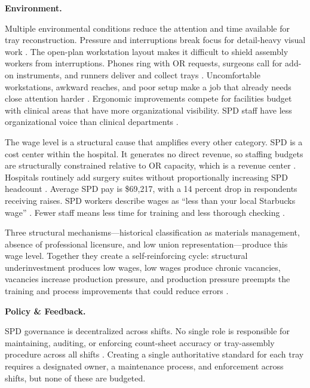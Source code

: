 \documentclass[10pt,a4paper]{article}
\begin{document}
\textbf{Environment.}

Multiple environmental conditions reduce the attention and time available for
tray reconstruction. Pressure and interruptions break focus for detail-heavy
visual work
\cite{alfred-et-al-2021, huang-et-al-2025}. The open-plan
workstation layout makes it difficult to shield assembly workers from
interruptions. Phones ring with OR requests, surgeons call for add-on
instruments, and runners deliver and collect trays
\cite{huang-et-al-2025}. Uncomfortable workstations, awkward reaches, and poor
setup make a job that already needs close attention harder
\cite{osha-central-sterile-supply-accessed-2026, cdc-niosh-2024, osha-computer-workstations-accessed-2026}. Ergonomic improvements compete
for facilities budget with clinical areas that have more organizational
visibility. SPD staff have less organizational voice than clinical departments
\cite{surgical-directions-spd-invisible-2025}.

The wage level is a structural cause that amplifies every other category. SPD is
a cost center within the hospital. It generates no direct revenue, so staffing
budgets are structurally constrained relative to OR capacity, which is a revenue
center
\cite{steris-capital-budgeting-2024, moab-healthcare-spd-cost-center-2024}. Hospitals routinely add surgery
suites without proportionally increasing SPD headcount
\cite{ingold-2025}. Average
SPD pay is \$69,217, with a 14 percent drop in respondents receiving raises. SPD
workers describe wages as ``less than your local Starbucks wage''
\cite{nadeau-2023-spd-salary-survey, perry-circulating-life-spd-2022}. Fewer
staff means less time for training and less thorough checking
\cite{alfred-et-al-2021, aorn-staffing-shortage-2025, macola-et-al-2025, brozak-2025, onet-medical-equipment-preparers-accessed-2026}.

Three structural mechanisms---historical classification as materials management,
absence of professional licensure, and low union representation---produce this
wage level. Together they create a self-reinforcing cycle: structural
underinvestment produces low wages, low wages produce chronic vacancies,
vacancies increase production pressure, and production pressure preempts the
training and process improvements that could reduce errors
\cite{evolved-sterile-processing-2025, specialtycare-travel-spd-2026, bls-union-2023, trends-in-labor-unionization-2022, ashhra-2024}.

\textbf{Policy \& Feedback.}

SPD governance is decentralized across shifts. No single role is responsible for
maintaining, auditing, or enforcing count-sheet accuracy or tray-assembly
procedure across all shifts
\cite{nadeau-2024, loria-2024}. Creating a single
authoritative standard for each tray requires a designated owner, a maintenance
process, and enforcement across shifts, but none of these are budgeted.
\end{document}
